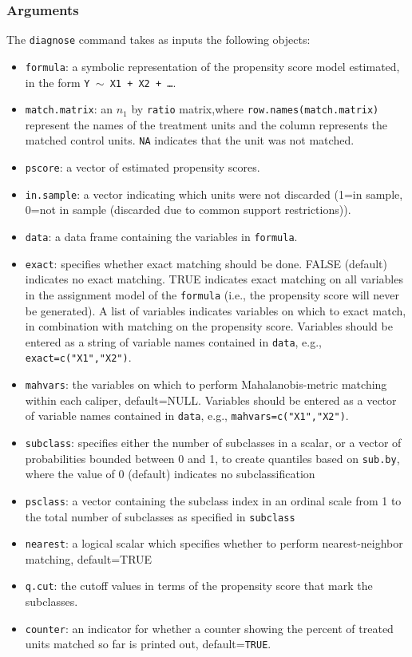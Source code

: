 \documentclass[oneside,letterpaper,titlepage]{article}
\begin{document}
\begin{appendix}
\subsubsection{Arguments}
The \texttt{diagnose} command takes as inputs the following objects:
\begin{itemize}
\item \texttt{formula}: a symbolic representation of the propensity score
  model estimated, in the form {\tt Y $\sim$ X1 + X2 + \dots}.
\item \texttt{match.matrix}: an $n_1$ by \texttt{ratio} matrix,where
  \texttt{row.names(match.matrix)} represent the names of the
  treatment units and the column represents the matched control units.
  \texttt{NA} indicates that the unit was not matched.
\item \texttt{pscore}: a vector of estimated propensity scores.  
\item \texttt{in.sample}: a vector indicating which units were not discarded
  (1=in sample, 0=not in sample (discarded due to common support
  restrictions)).
\item \texttt{data}: a data frame containing the variables in \texttt{formula}.
\item \texttt{exact}: specifies whether exact matching should be done.  FALSE
  (default) indicates no exact matching.  TRUE indicates exact
  matching on all variables in the assignment model of the
  \texttt{formula} (i.e., the propensity score will never be
  generated).  A list of variables indicates variables on which to
  exact match, in combination with matching on the propensity score.
  Variables should be entered as a string of variable names contained
  in \texttt{data}, e.g., \texttt{exact=c("X1","X2")}.
\item \texttt{mahvars}: the variables on which to perform Mahalanobis-metric
  matching within each caliper, default=NULL.  Variables should be
  entered as a vector of variable names contained in \texttt{data},
  e.g., \texttt{mahvars=c("X1","X2")}.
\item \texttt{subclass}: specifies either the number of
  subclasses in a scalar, or a vector of probabilities bounded
  between 0 and 1, to create quantiles based on \texttt{sub.by}, where the value of
  0 (default) indicates no subclassification
\item \texttt{psclass}: a vector containing the subclass index in an ordinal
  scale from 1 to the total number of subclasses as specified in
  \texttt{subclass}
\item \texttt{nearest}: a logical scalar which specifies whether to perform
  nearest-neighbor matching, default=TRUE
\item \texttt{q.cut}: the cutoff values in terms of the propensity score that
  mark the subclasses.
\item \texttt{counter}: an indicator for whether a counter showing the percent
  of treated units matched so far is printed out, default={\tt TRUE}.
\end{itemize}


\end{appendix}
\end{document}
